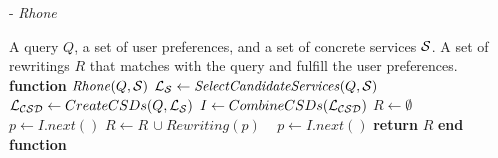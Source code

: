 \begin{algorithm}[h!]
\small
\caption{ - \textit{Rhone}}
\label{algo-rhone}
\begin{algorithmic}[1]
\REQUIRE A query $Q$, a set of user preferences, and a set of concrete services $\bigS$.
\ENSURE A set of rewritings $R$ that matches with the query and fulfill the user preferences.
\STATE \textbf{function} $\mathit{Rhone} (Q, \bigS)$
 \STATE  $\bigLS \leftarrow \mathit{SelectCandidateServices}(Q, \bigS)$ \label{rhone:buildPCD}
 \STATE  $\bigLCSD \leftarrow CreateCSDs(Q, \bigLS)$
 \STATE  $I \leftarrow CombineCSDs(\bigLCSD)$
 \STATE $R\leftarrow \emptyset$
 \STATE ~\! 
    \STATE $p \leftarrow I.next()$
  \STATE $R\leftarrow R\,\cup \mathit{Rewriting}(p)$
  \STATE ~\!
   \ENDIF
      \STATE $p \leftarrow I.\mathit{next}()$
 \ENDWHILE
    \STATE \textbf{return} $R$
\STATE \textbf{end function}
\end{algorithmic}
\end{algorithm}
%
